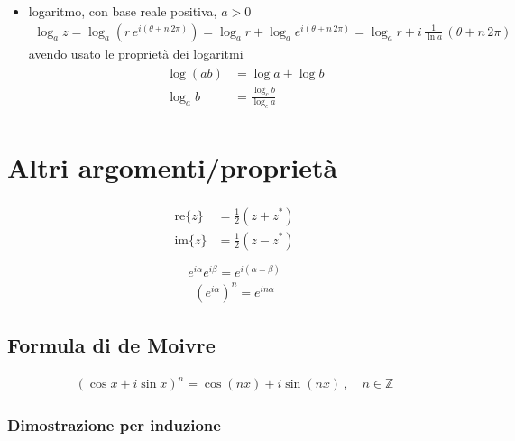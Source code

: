 \documentclass[letterpaper,10pt,italian]{jupyterBook}
\begin{document}
\begin{itemize}
\item {} 
\sphinxAtStartPar
logaritmo, con base reale positiva, \(a > 0\)
\begin{equation*}
\begin{split}\log_a z = \log_a \left( r \, e^{i ( \theta + n \, 2 \pi )} \right) = \log_a r + \log_a e^{i (\theta + n \, 2 \pi )} = \log_a r + i \, \frac{1}{\ln a} \, \left( \theta + n \, 2 \pi \right)\end{split}
\end{equation*}
\sphinxAtStartPar
avendo usato le proprietà dei logaritmi
\begin{equation*}
\begin{split}\begin{aligned}
     \log ( a b ) & = \log a + \log b \\
     \log_a b & = \frac{\log_c b}{\log_c a}
   \end{aligned}\end{split}
\end{equation*}
\end{itemize}




\section{Altri argomenti/proprietà}
\label{\detokenize{ch/algebra/complex-algebra:altri-argomenti-proprieta}}\begin{equation*}
\begin{split}\begin{aligned}
  \text{re} \{ z \} & = \frac{1}{2} \left( z + z^* \right) \\
  \text{im} \{ z \} & = \frac{1}{2} \left( z - z^* \right) \\
\end{aligned}\end{split}
\end{equation*}\begin{equation*}
\begin{split}e^{i \alpha} e^{i \beta} = e^{i (\alpha + \beta)}\end{split}
\end{equation*}\begin{equation*}
\begin{split}\left( e^{i \alpha} \right)^n = e^{i n \alpha}\end{split}
\end{equation*}

\subsection{Formula di de Moivre}
\label{\detokenize{ch/algebra/complex-algebra:formula-di-de-moivre}}\begin{equation*}
\begin{split}(\cos x + i \sin x)^n = \cos(nx) + i \sin(nx) \ , \quad n \in \mathbb{Z}\end{split}
\end{equation*}\subsubsection*{Dimostrazione per induzione}
\end{document}
